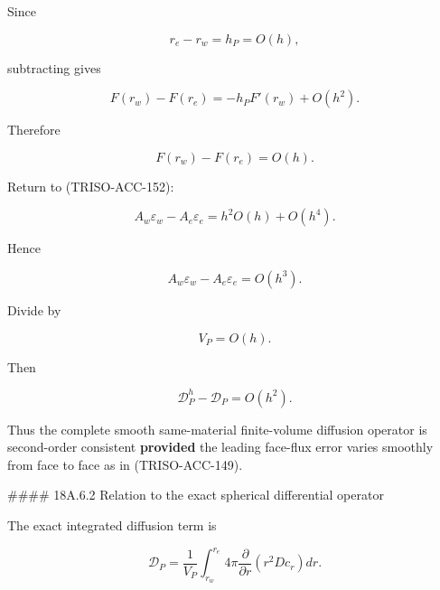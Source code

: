 \documentclass[11pt,a4paper]{article}
\begin{document}
Since

\begin{equation}
r_e-r_w=h_P=O(h),
\tag{TRISO-ACC-157}
\label{eq:triso-acc-157}
\end{equation}

subtracting gives

\begin{equation}
F(r_w)-F(r_e)
=
-h_PF'(r_w)
+
O(h^2).
\tag{TRISO-ACC-158}
\label{eq:triso-acc-158}
\end{equation}

Therefore

\begin{equation}
F(r_w)-F(r_e)=O(h).
\tag{TRISO-ACC-159}
\label{eq:triso-acc-159}
\end{equation}

Return to (TRISO-ACC-152):

\begin{equation}
A_w\varepsilon_w-A_e\varepsilon_e
=
h^2O(h)
+
O(h^4).
\tag{TRISO-ACC-160}
\label{eq:triso-acc-160}
\end{equation}

Hence

\begin{equation}
\boxed{
A_w\varepsilon_w-A_e\varepsilon_e
=
O(h^3).
}
\tag{TRISO-ACC-161}
\label{eq:triso-acc-161}
\end{equation}

Divide by

\begin{equation}
V_P=O(h).
\tag{TRISO-ACC-162}
\label{eq:triso-acc-162}
\end{equation}

Then

\begin{equation}
\boxed{
\mathcal D_P^h-\mathcal D_P
=
O(h^2).
}
\tag{TRISO-ACC-163}
\label{eq:triso-acc-163}
\end{equation}

Thus the complete smooth same-material finite-volume diffusion operator is second-order consistent \textbf{provided} the leading face-flux error varies smoothly from face to face as in (TRISO-ACC-149).

\#\#\#\# 18A.6.2 Relation to the exact spherical differential operator

The exact integrated diffusion term is

\begin{equation}
\mathcal D_P
=
\frac1{V_P}
\int_{r_w}^{r_e}
4\pi
\frac{\partial}{\partial r}
\left(
r^2D c_r
\right)dr.
\tag{TRISO-ACC-164}
\label{eq:triso-acc-164}
\end{equation}
\end{document}
